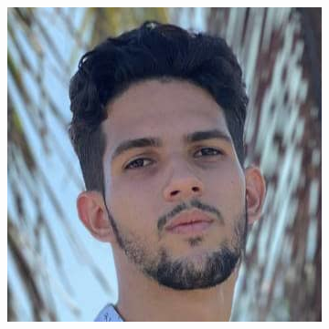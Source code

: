 \vspace*{0.2in}

\begin{minipage}{0.2\textwidth}
	\includegraphics[width=\linewidth]{img/concursantes/alejandro.png} %
\end{minipage}
\hfill
